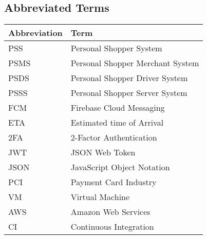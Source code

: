 \subsection{Abbreviated Terms}
\begin{center}
    \begin{tabular}{p{}p{}}
    \hline
    \textbf{Abbreviation} & \textbf{Term} \\ 
     \hline
     PSS & Personal Shopper System \\  
     \hline
     PSMS &  Personal Shopper Merchant System \\  
     \hline
     PSDS &  Personal Shopper Driver System \\  
     \hline
     PSSS &  Personal Shopper Server System \\  
     \hline
     FCM &  Firebase Cloud Messaging \\  
     \hline
     ETA & Estimated time of Arrival \\  
     \hline
     2FA & 2-Factor Authentication  \\  
     \hline
     JWT & JSON Web Token  \\  
     \hline
     JSON & JavaScript Object Notation \\ 
     \hline
     PCI & Payment Card Industry \\ 
     \hline
     VM & Virtual Machine \\ 
     \hline
     AWS & Amazon Web Services \\ 
     \hline
     CI & Continuous Integration \\ 
     \hline
    \end{tabular}
\end{center}

\pagebreak

